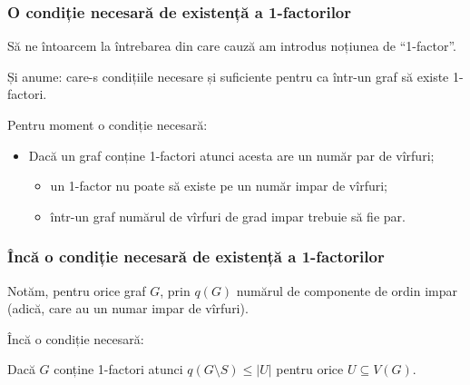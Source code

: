 \begin{frame}
  \frametitle{O condiție necesară de existență a 1-factorilor}

Să ne întoarcem la întrebarea din care cauză am introdus noțiunea de ``1-factor''.\pause

Și anume: \alert{care-s condițiile necesare și suficiente pentru ca într-un graf să existe 1-factori}.\pause

\alert{Pentru moment o condiție necesară:}\pause

\begin{itemize}[<+->]
  \item Dacă un graf conține 1-factori atunci acesta are un număr par de vîrfuri;
    \begin{itemize}
      \item un 1-factor nu poate să existe pe un număr impar de vîrfuri;
      \item într-un graf numărul de vîrfuri de grad impar trebuie să fie par.
    \end{itemize}
\end{itemize}


\end{frame}

\begin{frame}
  \frametitle{Încă o condiție necesară de existență a 1-factorilor}

Notăm, pentru orice graf $G$, prin $q(G)$ numărul de componente de ordin impar (adică, care au un numar impar de vîrfuri).\pause

\alert{Încă o condiție necesară:}\pause

Dacă $G$ conține 1-factori atunci $q(G\setminus S)\leq |U|$ pentru orice $U\subseteq V(G)$.

\end{frame}

